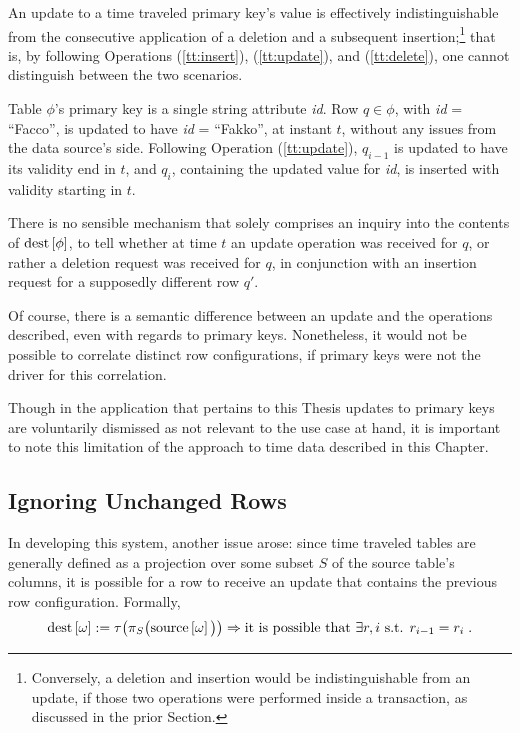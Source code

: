 An update to a time traveled primary key's value is effectively indistinguishable from the consecutive application of a deletion and a subsequent insertion;\footnote{%
	Conversely, a deletion and insertion would be indistinguishable from an update, if those two operations were performed inside a transaction, as discussed in the prior Section.
} that is, by following Operations (\ref{tt:insert}), (\ref{tt:update}), and (\ref{tt:delete}), one cannot distinguish between the two scenarios.

\begin{example}
	Table $\phi$'s primary key is a single string attribute \emph{id}.
	Row $q \in \phi$, with \emph{id} = ``Facco'', is updated to have \emph{id} = ``Fakko'', at instant $t$, without any issues from the data source's side.
	Following Operation (\ref{tt:update}), $q_{i-1}$ is updated to have its validity end in $t$, and $q_i$, containing the updated value for \emph{id}, is inserted with validity starting in $t$.
	
	There is no sensible mechanism that solely comprises an inquiry into the contents of $\text{dest}\left[{\phi}\right]$, to tell whether at time $t$ an update operation was received for $q$, or rather a deletion request was received for $q$, in conjunction with an insertion request for a supposedly different row $q'$.
\end{example}

Of course, there is a semantic difference between an update and the operations described, even with regards to primary keys.
Nonetheless, it would not be possible to correlate distinct row configurations, if primary keys were not the driver for this correlation.

Though in the application that pertains to this Thesis updates to primary keys are voluntarily dismissed as not relevant to the use case at hand, it is important to note this limitation of the approach to time data described in this Chapter.


\subsection{Ignoring Unchanged Rows}

In developing this system, another issue arose: since time traveled tables are generally defined as a projection over some subset $S$ of the source table's columns, it is possible for a row to receive an update that contains the previous row configuration.
Formally,
$$
\text{dest}\left[{\omega}\right] := \tau\big(\pi_{S}\big(\text{source}\left[{\omega}\right]\big)\big) \Rightarrow
\text{it is possible that } \exists r, i \text{ s.t. } r_{i-1} = r_i \; .
$$

